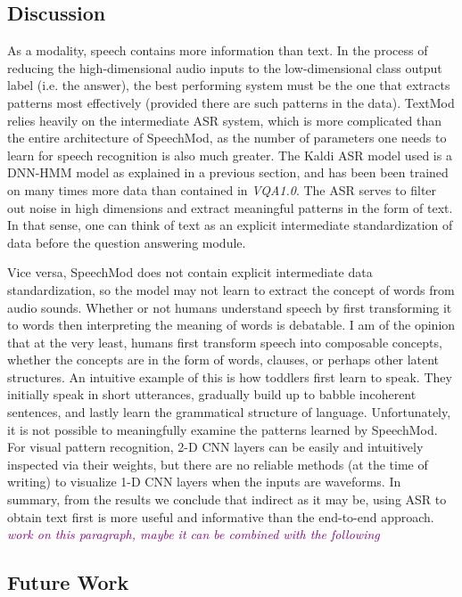 \documentclass[letterpaper]{article} %
\newcommand{\tz}[1]{\textcolor{purple}{\textit{#1}}}
\begin{document}
\subsection{Discussion}
As a modality, speech contains more information than text. In the process of reducing the high-dimensional audio inputs to the low-dimensional class output label (i.e. the answer), the best performing system must be the one that extracts patterns most effectively (provided there are such patterns in the data). TextMod relies heavily on the intermediate ASR system, which is more complicated than the entire architecture of SpeechMod, as the number of parameters one needs to learn for speech recognition is also much greater. The Kaldi ASR model used is a DNN-HMM model as explained in a previous section, and has been been trained on many times more data than contained in \textit{VQA1.0}. The ASR serves to filter out noise in high dimensions and extract meaningful patterns in the form of text. In that sense, one can think of text as an explicit intermediate standardization of data before the question answering module. 

Vice versa, SpeechMod does not contain explicit intermediate data standardization, so the model may not learn to extract the concept of words from audio sounds. Whether or not humans understand speech by first transforming it to words then interpreting the meaning of words is debatable. I am of the opinion that at the very least, humans first transform speech into composable concepts, whether the concepts are in the form of words, clauses, or perhaps other latent structures. An intuitive example of this is how toddlers first learn to speak. They initially speak in short utterances, gradually build up to babble incoherent sentences, and lastly learn the grammatical structure of language. Unfortunately, it is not possible to meaningfully examine the patterns learned by SpeechMod. For visual pattern recognition, 2-D CNN layers can be easily and intuitively inspected via their weights, but there are no reliable methods (at the time of writing) to visualize 1-D CNN layers when the inputs are waveforms. In summary, from the results we conclude that indirect as it may be, using ASR to obtain text first is more useful and informative than the end-to-end approach. \tz{work on this paragraph, maybe it can be combined with the following}

\subsection{Future Work}
\end{document}
